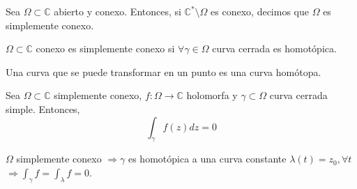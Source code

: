 \begin{defn}
  Sea $\Omega \subset \mathbb{C}$ abierto y conexo. Entonces, si $\mathbb{C}^* \setminus \Omega$ es conexo, decimos que $\Omega$ es simplemente conexo.
\end{defn}

\begin{obs}
  $\Omega \subset \mathbb{C}$ conexo es simplemente conexo si $\forall \gamma \in \Omega$ curva cerrada es homotópica.
\end{obs}


\begin{prop}
  Una curva que se puede transformar en un punto es una curva homótopa.
\end{prop}

\begin{theo}
  Sea $\Omega \subset \mathbb{C}$ simplemente conexo, $f: \Omega \to \mathbb{C}$  holomorfa y $\gamma \subset \Omega$ curva cerrada simple. Entonces, 
  \[ 
    \int_{\gamma}^{} f(z) dz = 0 
  \] 
\end{theo}

\begin{dem}
  $\Omega$ simplemente conexo $\Rightarrow \gamma$ es homotópica a una curva constante $\lambda(t) = z_{0}, \forall t$ $\Rightarrow \int_{\gamma}^{} f = \int_{\lambda}^{} f = 0$.
\end{dem}
